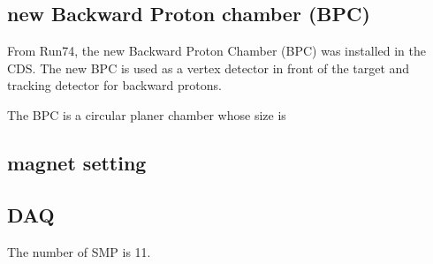 \subsection{new Backward Proton chamber (BPC)}
From Run74, the new Backward Proton Chamber (BPC) was installed in the CDS. The new BPC is used as a vertex detector in front of the target and tracking detector for backward protons.


The BPC is a circular planer chamber whose size is 


\subsection{magnet setting}


\subsection{DAQ}
The number of SMP is 11. 

